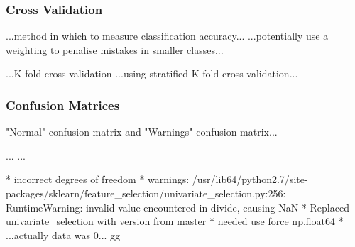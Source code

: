 \subsubsection{Cross Validation}

...method in which to measure classification accuracy...
...potentially use a weighting to penalise mistakes in smaller classes...

...K fold cross validation
...using stratified K fold cross validation...

\subsubsection{Confusion Matrices}
"Normal" confusion matrix and "Warnings" confusion matrix...

...
...

* incorrect degrees of freedom
* warnings: /usr/lib64/python2.7/site-packages/sklearn/feature\_selection/univariate\_selection.py:256: RuntimeWarning: invalid value encountered in divide, causing NaN
* Replaced univariate\_selection with version from master
* needed use force np.float64
* ...actually data was 0... gg

